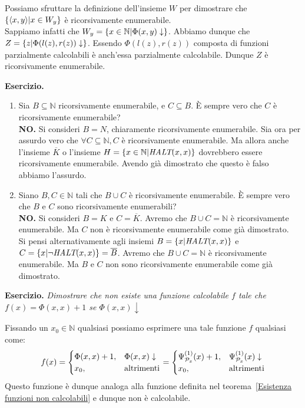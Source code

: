 Possiamo sfruttare la definizione dell'insieme \(W\) per dimostrare che \(\displaystyle{\left\{{ \displaystyle{\left\langle{ x,y }\right\rangle} \vert x \in W_y}\right\}}\) è ricorsivamente enumerabile.\\
Sappiamo infatti che \(W_y=\displaystyle{\left\{{x \in \mathbb{N} \vert \Phi(x, y)\downarrow}\right\}}\). Abbiamo dunque che \(Z=\displaystyle{\left\{{z \vert \Phi(l(z),r(z))\downarrow}\right\}}\). Essendo \(\Phi(l(z),r(z))\) composta di funzioni parzialmente calcolabili è anch'essa parzialmente calcolabile. Dunque \(Z\) è ricorsivamente enumerabile.

\textbf{Esercizio. } \begin{enumerate}
    \item Sia \(B\subseteq \mathbb{N}\) ricorsivamente enumerabile, e \(C \subseteq B\). È sempre vero che \(C\) è ricorsivamente enumerabile?\\
    \textbf{NO.} Si consideri \(B=N\), chiaramente ricorsivamente enumerabile. Sia ora per assurdo vero che \(\forall C \subseteq \mathbb{N}, C\) è ricorsivamente enumerabile. Ma allora anche l'insieme \(\overline{K}\) o l'insieme \(H=\displaystyle{\left\{{x \in \mathbb{N} \vert \textit{HALT}(x,x)}\right\}}\) dovrebbero essere ricorsivamente enumerabile. Avendo già dimostrato che questo è falso abbiamo l'assurdo.
    \item Siano \(B,C \in \mathbb{N}\) tali che \(B\cup C\) è ricorsivamente enumerabile. È sempre vero che \(B\) e \(C\) sono ricorsivamente enumerabili?\\
    \textbf{NO.} Si consideri \(B=K\) e \(C=\overline{K}\). Avremo che \(B\cup C = \mathbb{N}\) è ricorsivamente enumerabile. Ma \(C\) non è ricorsivamente enumerabile come già dimostrato.\\
    Si pensi alternativamente agli insiemi \(B=\displaystyle{\left\{{x \vert \textit{HALT}(x,x)}\right\}}\) e \(C=\displaystyle{\left\{{x \vert \neg \textit{HALT}(x,x)}\right\}}=\overline{B}\). Avremo che \(B\cup C = \mathbb{N}\) è ricorsivamente enumerabile. Ma \(B\) e \(C\) non sono ricorsivamente enumerabile come già dimostrato.
\end{enumerate}

\textbf{Esercizio. } \textit{Dimostrare che non esiste una funzione calcolabile \(f\) tale che \(f(x)=\Phi(x,x)+1\) se \(\Phi(x,x)\downarrow\)}

Fissando un \(x_0 \in \mathbb{N}\) qualsiasi possiamo esprimere una tale funzione \(f\) qualsiasi come:
\begin{equation}
    f(x)=\begin{cases}
        \Phi(x,x)+1, & \Phi(x,x)\downarrow\\
        x_0, & \text{altrimenti}
    \end{cases} = \begin{cases}
        \Psi_{\mathcal{P}_x}^{(1)}(x)+1, & \Psi_{\mathcal{P}_x}^{(1)}(x)\downarrow\\
        x_0, & \text{altrimenti}
    \end{cases}
\end{equation}
Questo funzione è dunque analoga alla funzione definita nel teorema~\ref{Esistenza funzioni non calcolabili} e dunque non è calcolabile.

\newpage
